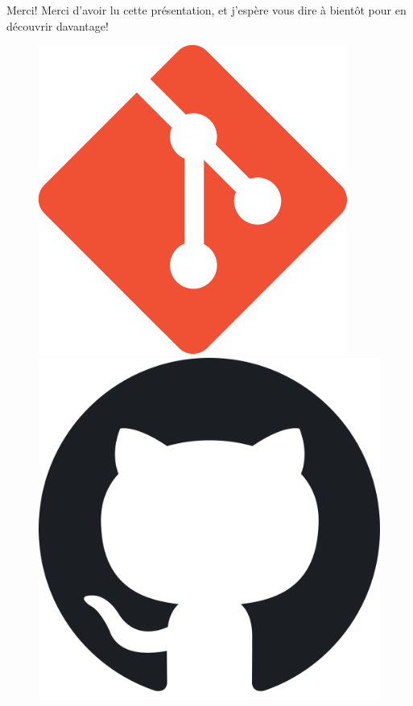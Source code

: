 \documentclass{beamer}
\begin{document}
\begin{frame}{Merci!}
    Merci d'avoir lu cette présentation, et j'espère vous dire à bientôt pour en découvrir davantage!
    \bigskip
   \begin{figure}[!htb] 
    \begin{minipage}{0.48\textwidth}
            \begin{center}
                \includegraphics[scale=0.17]{images/git.png}
            \end{center}
        \end{minipage}
        \hfill
        \begin{minipage}{0.48\textwidth}
            \begin{center}
                \includegraphics[scale=0.05]{images/github.png}
            \end{center}
        \end{minipage}
    \end{figure}
\end{frame}
\end{document}
